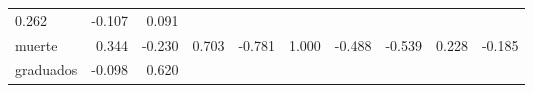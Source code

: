 \documentclass[]{article}
\begin{document}
\begin{longtable}[]{@{}lrrrrrrrrr@{}}
\begin{minipage}[t]{0.06\columnwidth}
0.262\strut
\end{minipage} & \begin{minipage}[t]{0.05\columnwidth}\raggedleft\strut
-0.107\strut
\end{minipage} & \begin{minipage}[t]{0.10\columnwidth}\raggedleft\strut
0.091\strut
\end{minipage}\tabularnewline
\begin{minipage}[t]{0.10\columnwidth}\raggedright\strut
muerte\strut
\end{minipage} & \begin{minipage}[t]{0.08\columnwidth}\raggedleft\strut
0.344\strut
\end{minipage} & \begin{minipage}[t]{0.07\columnwidth}\raggedleft\strut
-0.230\strut
\end{minipage} & \begin{minipage}[t]{0.10\columnwidth}\raggedleft\strut
0.703\strut
\end{minipage} & \begin{minipage}[t]{0.07\columnwidth}\raggedleft\strut
-0.781\strut
\end{minipage} & \begin{minipage}[t]{0.05\columnwidth}\raggedleft\strut
1.000\strut
\end{minipage} & \begin{minipage}[t]{0.07\columnwidth}\raggedleft\strut
-0.488\strut
\end{minipage} & \begin{minipage}[t]{0.06\columnwidth}\raggedleft\strut
-0.539\strut
\end{minipage} & \begin{minipage}[t]{0.05\columnwidth}\raggedleft\strut
0.228\strut
\end{minipage} & \begin{minipage}[t]{0.10\columnwidth}\raggedleft\strut
-0.185\strut
\end{minipage}\tabularnewline
\begin{minipage}[t]{0.10\columnwidth}\raggedright\strut
graduados\strut
\end{minipage} & \begin{minipage}[t]{0.08\columnwidth}\raggedleft\strut
-0.098\strut
\end{minipage} & \begin{minipage}[t]{0.07\columnwidth}\raggedleft\strut
0.620\strut
\end{minipage} & \begin{minipage}[t]{0.10\columnwidth}\raggedleft\strut

\end{minipage}
\end{longtable}
\end{document}

